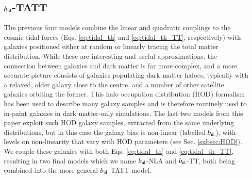  
\subsection{$b_{\rm nl}$-TATT}
\label{subsec:HOD-TATT}


The previous four models combine the linear and quadratic couplings to the cosmic tidal forces  (Eqs. \ref{eq:tidal_th} and \ref{eq:tidal_th_TT}, respectively) with galaxies positioned  either at random or linearly tracing the total matter distribution.
While these are interesting and useful approximations, the connection between galaxies and dark matter is far more complex, and a more accurate picture consists of galaxies populating dark matter haloes, typically with a relaxed, older galaxy close to the centre, and a number of other satellite galaxies orbiting the former.
This halo occupation distribution (HOD) formalism has been used to describe many galaxy samples \citep[\eg][]{SDSS-HOD, BOSS-HOD, GAMA-HOD, DESI-HOD} and is therefore routinely used to in-paint galaxies in dark matter-only simulations.
The last two models from this paper exploit such HOD galaxy samples, extracted from the same underlying distributions, but in this case the galaxy bias is non-linear (labelled $b_{\rm nl}$), with levels on non-linearity that vary with HOD parameters (see Sec. \ref{subsec:HOD}).
We couple these galaxies with both Eqs. \ref{eq:tidal_th} and \ref{eq:tidal_th_TT}, resulting in two final models which we name  $b_{\rm nl}$-NLA and  $b_{\rm nl}$-TT, both being combined into the more general  $b_{\rm nl}$-TATT model.



